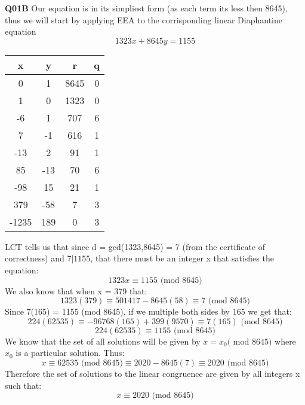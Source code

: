 \documentclass[11pt]{article}
\begin{document}
\textbf{Q01B} Our equation is in its simpliest form (as each term its less then 8645), thus we will start by applying EEA to the corrisponding linear Diaphantine equation
\[  1323x + 8645y = 1155 \]
\begin{center}
 \begin{tabular}{||c c c c||} 
 \hline
 x & y & r & q \\ [0.5ex] 
 \hline\hline
 0 & 1 & 8645 & 0 \\ 
 \hline
 1 & 0 & 1323 & 0 \\
 \hline
 -6 & 1 & 707 & 6 \\
 \hline
 7 & -1 & 616 & 1 \\
 \hline
 -13 &  2 & 91 & 1 \\ 
 \hline
 85 & -13  & 70 & 6 \\
 \hline
 -98 &  15 & 21 & 1 \\ 
 \hline
379 &  -58 & 7 & 3\\ 
 \hline
-1235 & 189 & 0 & 3\\ 
 \hline
\end{tabular}
\end{center}
 LCT tells us that since d = gcd(1323,8645) = 7 (from the certificate of correctness) and $7|1155$, that there must be an integer x that satisfies the equation:
\[  1323x \equiv 1155 \text{ (mod 8645)} \]
We also know that when x = 379 that:
\[  1323(379) \equiv 501417 - 8645(58) \equiv 7 \text{ (mod 8645)} \]
Since 7(165) = 1155 (mod 8645), if we multiple both sides by 165 we get that:
\[  224(62535) \equiv -96768(165) + 399(9570) \equiv 7(165) \text{ (mod 8645)} \]
\[  224(62535) \equiv 1155 \text{ (mod 8645)} \]
We know that the set of all solutions will be given by $ x = x_0 \text{( mod 8645)} $ where $x_0$ is a particular solution. Thus:
\[  x \equiv 62535 \text{ (mod 8645)} \equiv 2020 - 8645(7) \equiv 2020 \text{ (mod 8645)} \]
Therefore the set of solutions to the linear congruence are given by all integers x such that:
\[  x \equiv 2020 \text{ (mod 8645)} \]
\end{document}
